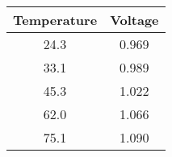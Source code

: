 \begin{center}
\begin{tabular}{|c|c|}
\hline
\textbf{Temperature} & \textbf{Voltage} \\
\hline
\large
24.3 & 0.969 \\
\hline
\large
33.1 & 0.989 \\
\hline
\large
45.3 & 1.022 \\
\hline
\large
62.0 & 1.066 \\
\hline
\large
75.1 & 1.090 \\
\hline
\end{tabular}
\end{center}